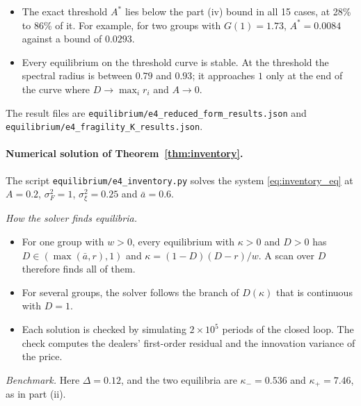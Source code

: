 \documentclass[12pt]{article}
\theoremstyle{definition}
\theoremstyle{remark}
\begin{document}
\begin{itemize}[itemsep=1pt,topsep=2pt]
\item The exact threshold $A^*$ lies below the part (iv) bound in all 15 cases, at 28\% to 86\% of it. For example, for two groups with $G(1)=1.73$, $A^*=0.0084$ against a bound of $0.0293$.
\item Every equilibrium on the threshold curve is stable. At the threshold the spectral radius is between $0.79$ and $0.93$; it approaches $1$ only at the end of the curve where $D\to\max_ir_i$ and $A\to0$.
\end{itemize}
The result files are \nolinkurl{equilibrium/e4_reduced_form_results.json} and \nolinkurl{equilibrium/e4_fragility_K_results.json}.

\paragraph{Numerical solution of Theorem~\ref{thm:inventory}.} The script \nolinkurl{equilibrium/e4_inventory.py} solves the system \eqref{eq:inventory_eq} at $A=0.2$, $\sigma_F^2=1$, $\sigma_\xi^2=0.25$ and $\bar a=0.6$.

\emph{How the solver finds equilibria.}
\begin{itemize}[itemsep=1pt,topsep=2pt]
\item For one group with $w>0$, every equilibrium with $\kappa>0$ and $D>0$ has $D\in(\max(\bar a,r),1)$ and $\kappa=(1-D)(D-r)/w$. A scan over $D$ therefore finds all of them.
\item For several groups, the solver follows the branch of $D(\kappa)$ that is continuous with $D=1$.
\item Each solution is checked by simulating $2\times10^5$ periods of the closed loop. The check computes the dealers' first-order residual and the innovation variance of the price.
\end{itemize}

\emph{Benchmark.} Here $\Delta=0.12$, and the two equilibria are $\kappa_-=0.536$ and $\kappa_+=7.46$, as in part (ii).
\end{document}
